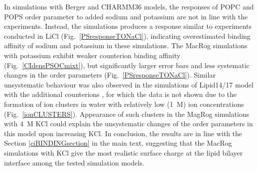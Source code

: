 \documentclass[journal=jpcbfk,manuscript=article]{achemso}
\begin{document}
In simulations with Berger and CHARMM36 models, the responses of POPC and POPS order parameter
to added sodium and potassium are not in line with the experiments. Instead, the simulations produces a response similar to experiments conducted in LiCl (Fig.~\ref{PSresponseTONaCl}), indicating overestimated binding affinity of sodium and potassium 
in these simulations. The MacRog simulations with potassium exhibit weaker counterion binding affinity
(Fig.~\ref{CIdensPSOCmixt}), but significantly larger error bars and
less systematic changes in the order parameters (Fig.~\ref{PSresponseTONaCl}).
Similar unsystematic behaviour was also observed in the simulations of Lipid14/17 model
with the additional counterions \cite{POPCpopsLIPID17withKCI,POPCpopsLIPID17withK,POPCpopsLIPID17withNaCI,POPCpopsLIPID17withNa},
for which the data is not shown due to the formation of
ion clusters in water with relatively low (1~M) ion concentrations (Fig.~\ref{ionCLUSTERS}).
Appearance of such clusters in the MagRog simulations with 4~M KCl
could explain the unsystematic changes of the order parameters in this model upon increasing KCl.
In conclusion, the results are in line with the Section \ref{ciBINDINGsection}
in the main text, suggesting that the MacRog simulations with KCl give the most
realistic surface charge at the lipid bilayer interface among the tested simulation models.
\end{document}
